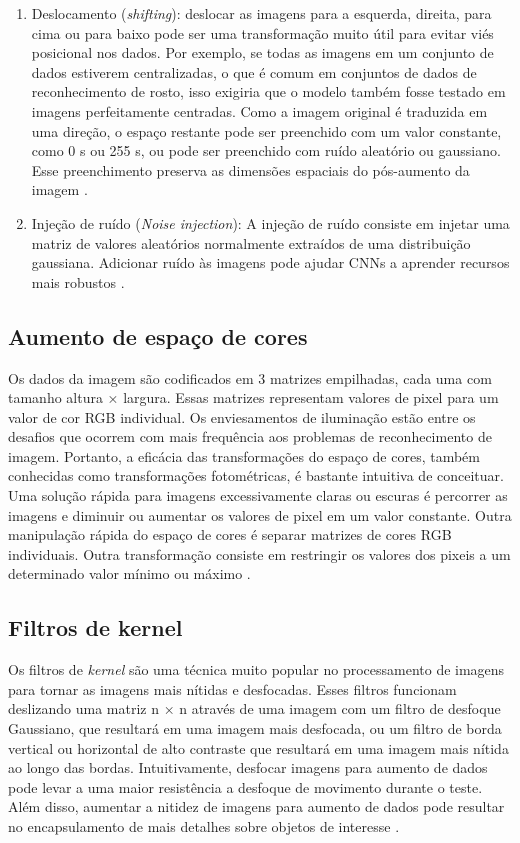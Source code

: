 \documentclass[
	12pt,				%
	oneside,			%
	a4paper,			%
	english,			%
	brazil				%
	]{abntex2ppgsi}
\begin{document}
\begin{enumerate}
  \item Deslocamento (\textit{shifting}): deslocar as imagens para a esquerda, direita, para cima ou para baixo pode ser uma transformação muito útil para evitar viés posicional nos dados. Por exemplo, se todas as imagens em um conjunto de dados estiverem centralizadas, o que é comum em conjuntos de dados de reconhecimento de rosto, isso exigiria que o modelo também fosse testado em imagens perfeitamente centradas. Como a imagem original é traduzida em uma direção, o espaço restante pode ser preenchido com um valor constante, como 0 s ou 255 s, ou pode ser preenchido com ruído aleatório ou gaussiano. Esse preenchimento preserva as dimensões espaciais do pós-aumento da imagem \cite{shorten2019survey}.
  
  \item Injeção de ruído (\textit{Noise injection}): A injeção de ruído consiste em injetar uma matriz de valores aleatórios normalmente extraídos de uma distribuição gaussiana. Adicionar ruído às imagens pode ajudar CNNs a aprender recursos mais robustos \cite{shorten2019survey}.
\end{enumerate}

\subsection{Aumento de espaço de cores}

Os dados da imagem são codificados em 3 matrizes empilhadas, cada uma com tamanho altura × largura. Essas matrizes representam valores de pixel para um valor de cor RGB individual. Os enviesamentos de iluminação estão entre os desafios que ocorrem com mais frequência aos problemas de reconhecimento de imagem. Portanto, a eficácia das transformações do espaço de cores, também conhecidas como transformações fotométricas, é bastante intuitiva de conceituar. Uma solução rápida para imagens excessivamente claras ou escuras é percorrer as imagens e diminuir ou aumentar os valores de pixel em um valor constante. Outra manipulação rápida do espaço de cores é separar matrizes de cores RGB individuais. Outra transformação consiste em restringir os valores dos pixeis a um determinado valor mínimo ou máximo \cite{shorten2019survey}.

\subsection{Filtros de kernel}

Os filtros de \textit{kernel} são uma técnica muito popular no processamento de imagens para tornar as imagens mais nítidas e desfocadas. Esses filtros funcionam deslizando uma matriz n × n através de uma imagem com um filtro de desfoque Gaussiano, que resultará em uma imagem mais desfocada, ou um filtro de borda vertical ou horizontal de alto contraste que resultará em uma imagem mais nítida ao longo das bordas. Intuitivamente, desfocar imagens para aumento de dados pode levar a uma maior resistência a desfoque de movimento durante o teste. Além disso, aumentar a nitidez de imagens para aumento de dados pode resultar no encapsulamento de mais detalhes sobre objetos de interesse \cite{shorten2019survey}.
\end{document}
